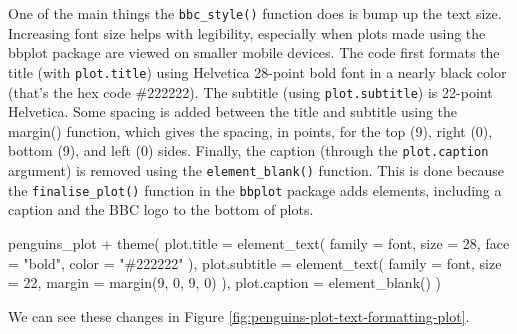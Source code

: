 \documentclass[
]{book}
\newenvironment{Shaded}{\begin{snugshade}}{\end{snugshade}}
\newcommand{\AttributeTok}[1]{\textcolor[rgb]{0.77,0.63,0.00}{#1}}
\newcommand{\DecValTok}[1]{\textcolor[rgb]{0.00,0.00,0.81}{#1}}
\newcommand{\FunctionTok}[1]{\textcolor[rgb]{0.00,0.00,0.00}{#1}}
\newcommand{\NormalTok}[1]{#1}
\newcommand{\SpecialCharTok}[1]{\textcolor[rgb]{0.00,0.00,0.00}{#1}}
\newcommand{\StringTok}[1]{\textcolor[rgb]{0.31,0.60,0.02}{#1}}
\begin{document}
One of the main things the \texttt{bbc\_style()} function does is bump up the text size. Increasing font size helps with legibility, especially when plots made using the bbplot package are viewed on smaller mobile devices. The code first formats the title (with \texttt{plot.title}) using Helvetica 28-point bold font in a nearly black color (that's the hex code \#222222). The subtitle (using \texttt{plot.subtitle}) is 22-point Helvetica. Some spacing is added between the title and subtitle using the margin() function, which gives the spacing, in points, for the top (9), right (0), bottom (9), and left (0) sides. Finally, the caption (through the \texttt{plot.caption} argument) is removed using the \texttt{element\_blank()} function. This is done because the \texttt{finalise\_plot()} function in the \texttt{bbplot} package adds elements, including a caption and the BBC logo to the bottom of plots.

\begin{Shaded}
\begin{Highlighting}[]
\NormalTok{penguins\_plot }\SpecialCharTok{+}
  \FunctionTok{theme}\NormalTok{(}
    \AttributeTok{plot.title =} \FunctionTok{element\_text}\NormalTok{(}
      \AttributeTok{family =}\NormalTok{ font,}
      \AttributeTok{size =} \DecValTok{28}\NormalTok{,}
      \AttributeTok{face =} \StringTok{"bold"}\NormalTok{,}
      \AttributeTok{color =} \StringTok{"\#222222"}
\NormalTok{    ),}
    \AttributeTok{plot.subtitle =} \FunctionTok{element\_text}\NormalTok{(}
      \AttributeTok{family =}\NormalTok{ font,}
      \AttributeTok{size =} \DecValTok{22}\NormalTok{,}
      \AttributeTok{margin =} \FunctionTok{margin}\NormalTok{(}\DecValTok{9}\NormalTok{, }\DecValTok{0}\NormalTok{, }\DecValTok{9}\NormalTok{, }\DecValTok{0}\NormalTok{)}
\NormalTok{    ),}
    \AttributeTok{plot.caption =} \FunctionTok{element\_blank}\NormalTok{()}
\NormalTok{  )}
\end{Highlighting}
\end{Shaded}

We can see these changes in Figure \ref{fig:penguins-plot-text-formatting-plot}.
\end{document}
